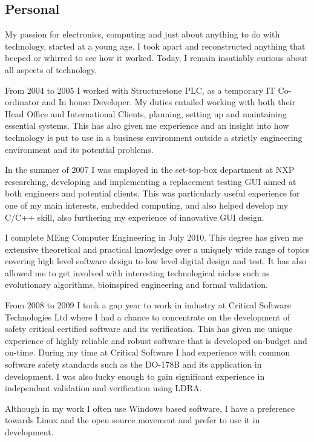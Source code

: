 \documentclass[overlapped,line,letterpaper]{res}
\begin{document}
\begin{resume}
\newpage

\section{\bf{ Personal } }
My passion for electronics, computing and just about anything to do with 
technology, started at a young age. 
I took apart and reconstructed anything that beeped or whirred to see how it
worked. 
Today, I remain insatiably curious about all aspects of technology. 

From 2004 to 2005 I worked with Structuretone PLC, as a temporary IT 
Co-ordinator and In house Developer. 
My duties entailed working with both their Head Office and International Clients, 
planning, setting up and maintaining essential systems. 
This has also given me experience and an insight into how technology is put to 
use in a business environment outside a strictly engineering environment and its
potential problems. 

In the summer of 2007 I was employed in the set-top-box department at NXP 
researching, developing and implementing a replacement testing GUI aimed at both
engineers and potential clients. 
This was particularly useful experience for one of my main interests, embedded 
computing, and also helped develop my C/C++ skill, also furthering my experience 
of innovative GUI design.

I complete MEng Computer Engineering in July 2010. 
This degree has given me extensive theoretical and practical knowledge over a 
uniquely wide range of topics covering high level software design to low level 
digital design and test. 
It has also allowed me to get involved with interesting technological niches 
such as evolutionary algorithms, bioinspired engineering and formal validation.

From 2008 to 2009 I took a gap year to work in industry at Critical Software 
Technologies Ltd where I had a chance to concentrate on the development of 
safety critical certified software and its verification. 
This has given me unique experience of highly reliable and robust software that
is developed on-budget and on-time. 
During my time at Critical Software I had experience with common software
safety standards such as the DO-178B and its application in development. 
I was also lucky enough to gain significant experience in independant validation
and verification using LDRA. 

Although in my work I often use Windows based software, I have a preference towards
Linux and the open source movement and prefer to use it in development.


\end{resume}
\end{document}
